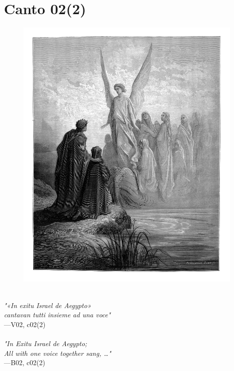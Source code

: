 \documentclass[../Dore_vision.tex]{subfiles}
\begin{document}
\newpage

\section{Canto 02(2)}

\begin{figure}[ht]
\centering
\includegraphics[height=\figsize]{illustrations/book_2/V02, c02(2).jpg}
\end{figure}

\begin{center}
\begin{minipage}{0.8\linewidth}
\textit{\\
"«In exitu Israel de Aegypto»\\cantavan tutti insieme ad una voce"} \\
—V02, c02(2) \\~\\
\textit{"\textquotesingle In Exitu Israel de Aegypto;\textquotesingle \\All with one voice together sang, …"} \\
—B02, c02(2)
\end{minipage}
\end{center}
\end{document}
